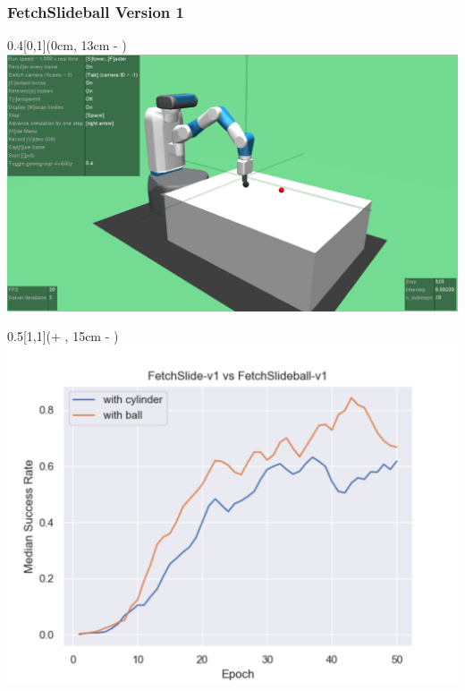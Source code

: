 





\begin{frame}
	\frametitle{FetchSlideball Version 1}	
	\vspace{1cm}
	

		\begin{textblock*}{0.4\paperwidth}[0,1](0cm, 13cm - \PraesentationSeitenrand)%
			\includegraphics[width=0.4\paperwidth]{./Ressourcen/Figures/FetchSlideball-v1.pdf}
		\end{textblock*}
		
		\begin{textblock*}{0.5\paperwidth}[1,1](\textwidth + \PraesentationSeitenrand, 15cm - \PraesentationSeitenrand)%
			\includegraphics[width=0.5\paperwidth]{./Ressourcen/Figures/fig_FetchSlide-v1_vs_FetchSlideball-v1.pdf}
		\end{textblock*}
	
	
\end{frame}
\clearpage

